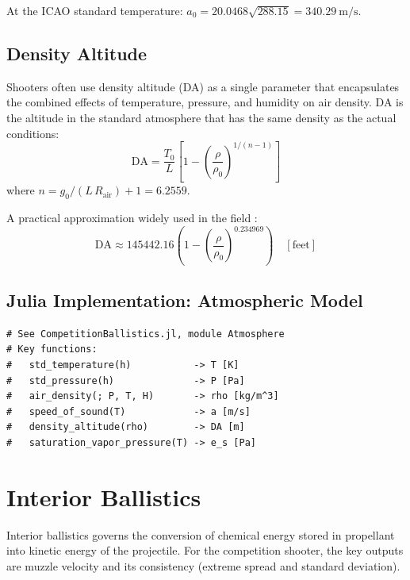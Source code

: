 \documentclass[11pt,twoside,openright]{report}
\begin{document}
At the ICAO standard temperature: $a_0 = 20.0468\sqrt{288.15} = \SI{340.29}{\meter\per\second}$.

\section{Density Altitude}

Shooters often use density altitude (DA) as a single parameter that encapsulates the combined effects of temperature, pressure, and humidity on air density. DA is the altitude in the standard atmosphere that has the same density as the actual conditions:
\begin{equation}
  \text{DA} = \frac{T_0}{L}\left[1 - \left(\frac{\rho}{\rho_0}\right)^{1/(n-1)}\right]
  \label{eq:density_altitude}
\end{equation}
where $n = g_0/(L\,R_{\mathrm{air}}) + 1 = 6.2559$.

A practical approximation widely used in the field \citep{litz2011applied}:
\begin{equation}
  \text{DA} \approx 145442.16 \left(1 - \left(\frac{\rho}{\rho_0}\right)^{0.234969}\right) \quad [\text{feet}]
  \label{eq:density_altitude_ft}
\end{equation}

\section{Julia Implementation: Atmospheric Model}

\begin{lstlisting}[caption={Atmospheric model in Julia},label={lst:atmos}]
# See CompetitionBallistics.jl, module Atmosphere
# Key functions:
#   std_temperature(h)           -> T [K]
#   std_pressure(h)              -> P [Pa]
#   air_density(; P, T, H)       -> rho [kg/m^3]
#   speed_of_sound(T)            -> a [m/s]
#   density_altitude(rho)        -> DA [m]
#   saturation_vapor_pressure(T) -> e_s [Pa]
\end{lstlisting}


\chapter{Interior Ballistics}
\label{ch:interior}

Interior ballistics governs the conversion of chemical energy stored in propellant into kinetic energy of the projectile. For the competition shooter, the key outputs are muzzle velocity and its consistency (extreme spread and standard deviation).
\end{document}
